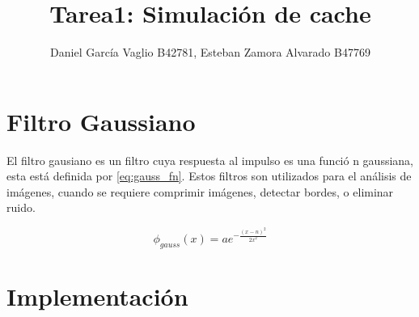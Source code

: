 \documentclass {article}
\begin{document}
\title{Tarea1: Simulación de cache}
\author{Daniel García Vaglio B42781, Esteban Zamora Alvarado B47769}

\maketitle


\section{Filtro Gaussiano}

El filtro gausiano es un filtro cuya respuesta al impulso es una funci\'o n gaussiana, esta est\'a
definida por \ref{eq:gauss_fn}. Estos filtros son utilizados para el an\'alisis de im\'agenes, cuando
se requiere comprimir im\'agenes, detectar bordes, o eliminar ruido. 

\begin{equation}
  \phi_{gauss}(x)=ae^{-\frac{(x-n)^2}{2x^2}}
\label{eq:gauss_fn}
\end{equation}

\section{Implementación}
\end{document}
